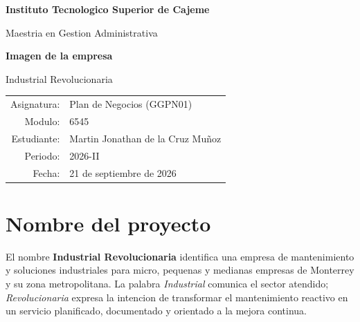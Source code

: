 \documentclass[12pt,letterpaper]{article}
\begin{document}
\begin{center}
{\large\bfseries Instituto Tecnologico Superior de Cajeme\par}
{\large Maestria en Gestion Administrativa\par}
\vspace{0.8cm}
{\LARGE\bfseries\color{industrialBlue} Imagen de la empresa\par}
\vspace{0.25cm}
{\Large Industrial Revolucionaria\par}
\vspace{0.7cm}
\begin{tabular}{rl}
Asignatura: & Plan de Negocios (GGPN01) \\
Modulo: & 6545 \\
Estudiante: & Martin Jonathan de la Cruz Muñoz \\
Periodo: & 2026-II \\
Fecha: & 21 de septiembre de 2026 \\
\end{tabular}
\end{center}

\vspace{0.8cm}
\begin{center}
\end{center}

\section*{Nombre del proyecto}
El nombre \textbf{Industrial Revolucionaria} identifica una empresa de mantenimiento y soluciones industriales para micro, pequenas y medianas empresas de Monterrey y su zona metropolitana. La palabra \textit{Industrial} comunica el sector atendido; \textit{Revolucionaria} expresa la intencion de transformar el mantenimiento reactivo en un servicio planificado, documentado y orientado a la mejora continua.
\end{document}
